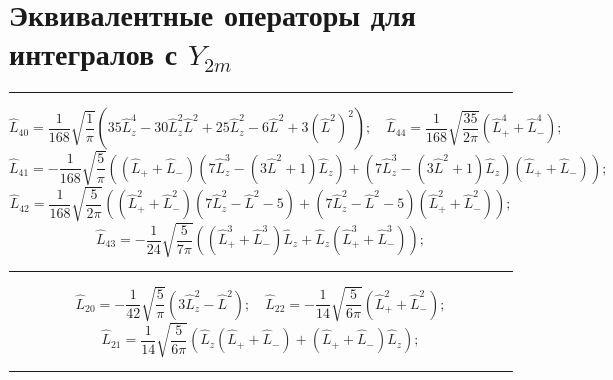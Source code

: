 \section{Эквивалентные операторы для интегралов с \texorpdfstring{$\textit{Y}_{2m}$}{|2 m>}}
\rule{\textwidth}{0.4pt}
\[ \widehat L_{40} = \frac{1}{168}\sqrt{\frac{1}{\pi}}\left( 35\widehat L_z^4-30\widehat L_z^2 \widehat L^2+25\widehat L_z^2-6\widehat L^2+3 (\widehat L^2)^2 \right); \quad \widehat L_{44} =\frac{1}{168}\sqrt{\frac{35}{2\pi}} \left( \widehat L_+^4 + \widehat L_-^4  \right);\]\hspace{\parindent}
\[ \widehat L_{41} = -\frac{1}{168}\sqrt{\frac{5}{\pi}} \left( (\widehat L_+ + \widehat L_- )(7\widehat L_z^3 - (3\widehat L^2 + 1)\widehat L_z) + (7\widehat L_z^3 - (3\widehat L^2 + 1)\widehat L_z)(\widehat L_+ + \widehat L_- ) \right); \]\hspace{\parindent}
\[ \widehat L_{42} =\frac{1}{168}\sqrt{\frac{5}{2\pi}} \left( (\widehat L_+^2 + \widehat L_-^2 )(7\widehat L_z^2 - \widehat L^2 - 5) + (7\widehat L_z^2 - \widehat L^2  - 5)(\widehat L_+^2 + \widehat L_-^2 ) \right); \]\hspace{\parindent}
\[ \widehat L_{43} =-\frac{1}{24}\sqrt{\frac{5}{7\pi}} \left( (\widehat L_+^3 + \widehat L_-^3 )\widehat L_z + \widehat L_z (\widehat L_+^3 + \widehat L_-^3 ) \right); \]
\rule{\textwidth}{0.4pt}
\[ \widehat L_{20} = -\frac{1}{42}\sqrt{\frac{5}{\pi}}\left(3\widehat L_z^2-\widehat L^2\right); \quad \widehat L_{22} =-\frac{1}{14}\sqrt{\frac{5}{6\pi}} \left( \widehat L_+^2 + \widehat L_-^2  \right); \]\hspace{\parindent}
\[ \widehat L_{21} = \frac{1}{14}\sqrt{\frac{5}{6\pi}}\left(\widehat L_z (\widehat L_+ + \widehat L_-)+(\widehat L_+ + \widehat L_-) \widehat L_z\right);\]
\rule{\textwidth}{0.4pt}

